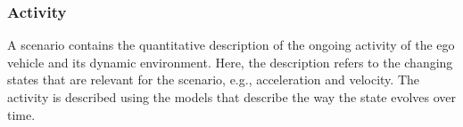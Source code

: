 \subsubsection{Activity}
\label{sec:activity}
A scenario contains the quantitative description of the ongoing activity of the ego vehicle and its dynamic environment. Here, the description refers to the changing states that are relevant for the scenario, e.g., acceleration and velocity. The activity is described using the models that describe the way the state evolves over time.
